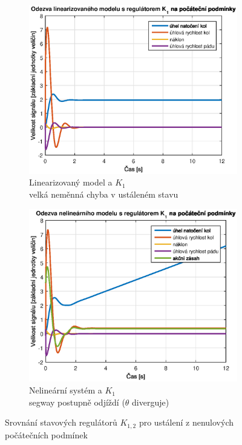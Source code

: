 \documentclass[conference]{IEEEtran}
\begin{document}
\begin{figure}[htbp]
    
\medskip

\begin{subfigure}{0.45\textwidth} 
    \centerline{\includegraphics[width=\linewidth]{stavova_K1_lin.eps}}
    \caption{Linearizovaný model a $K_1$ \\ velká neměnná chyba v ustáleném stavu}
    \label{fig:stavova_K1_lin}        
\end{subfigure}\hfil
\begin{subfigure}{0.45\textwidth}
    \centerline{\includegraphics[width=\linewidth]{stavova_K1_nelin.eps}}
    \caption{Nelineární systém a $K_1$ \\ segway postupně odjíždí ($\theta$ diverguje)}
    \label{fig:stavova_K1_nelin}        
\end{subfigure}\hfil

\caption{Srovnání stavových regulátorů $K_{1,2}$ pro ustálení z nenulových počátečních podmínek}
\label{fig:charakteristiky}
\end{figure}
\end{document}
